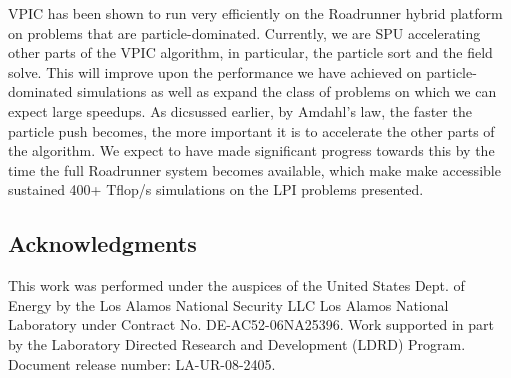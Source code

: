 \documentclass[10pt]{article}
\begin{document}
VPIC has been shown to run very efficiently on the Roadrunner hybrid 
platform on problems that are particle-dominated.  Currently, 
we are SPU accelerating other parts of the VPIC algorithm, in particular, 
the particle sort and the field solve.  This will improve upon the
performance we have achieved on particle-dominated simulations as 
well as expand the class of problems on which we can expect 
large speedups.  As dicsussed earlier, by Amdahl's law, the faster the 
particle push becomes, the more important it is to accelerate the other
parts of the algorithm.  We expect to have made significant progress
towards this by the time the full Roadrunner system becomes available,
which make make accessible sustained 400+ Tflop/s simulations on the 
LPI problems presented.  

\subsection*{Acknowledgments}
This work was performed under the auspices of the United States Dept. 
of Energy by the Los Alamos National Security LLC Los Alamos National
Laboratory under Contract No. DE-AC52-06NA25396.  Work supported in 
part by the Laboratory Directed Research and Development (LDRD) Program.
Document release number: LA-UR-08-2405. 


\begin{singlespace}


\end{singlespace}

\end{document}
